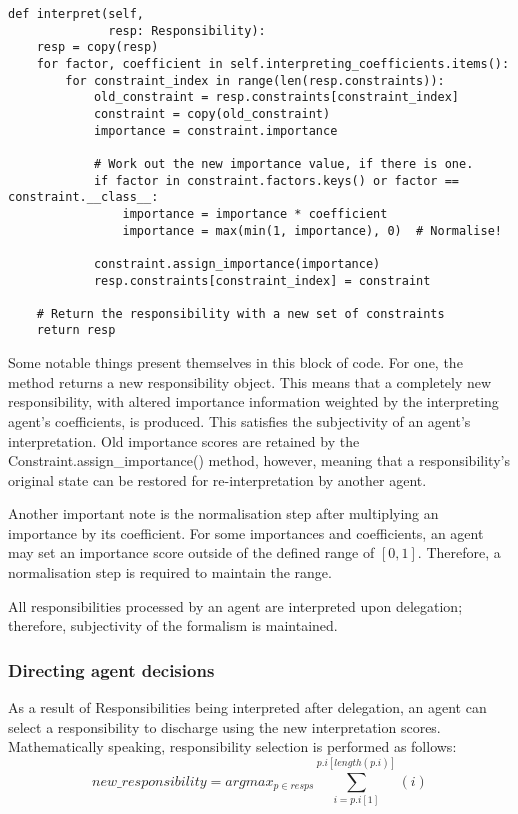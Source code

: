 \begin{lstlisting}
def interpret(self,
              resp: Responsibility):
    resp = copy(resp)
    for factor, coefficient in self.interpreting_coefficients.items():
        for constraint_index in range(len(resp.constraints)):
            old_constraint = resp.constraints[constraint_index]
            constraint = copy(old_constraint)
            importance = constraint.importance

            # Work out the new importance value, if there is one.
            if factor in constraint.factors.keys() or factor == constraint.__class__:
                importance = importance * coefficient
                importance = max(min(1, importance), 0)  # Normalise!

            constraint.assign_importance(importance)
            resp.constraints[constraint_index] = constraint

    # Return the responsibility with a new set of constraints
    return resp
\end{lstlisting}

Some notable things present themselves in this block of code. For one, the method returns a new responsibility object. This means that a completely new responsibility, with altered importance information weighted by the interpreting agent's coefficients, is produced. This satisfies the subjectivity of an agent's interpretation. Old importance scores are retained by the Constraint.assign\_importance() method, however, meaning that a responsibility's original state can be restored for re-interpretation by another agent.\par

Another important note is the normalisation step after multiplying an importance by its coefficient. For some importances and coefficients, an agent may set an importance score outside of the defined range of \([0,1]\). Therefore, a normalisation step is required to maintain the range.\par

All responsibilities processed by an agent are interpreted upon delegation; therefore, subjectivity of the formalism is maintained.\par

\subsubsection{Directing agent decisions}  %
As a result of Responsibilities being interpreted after delegation, an agent can select a responsibility to discharge using the new interpretation scores. Mathematically speaking, responsibility selection is performed as follows: \[new\_responsibility = argmax_{p \in resps} {\sum_{i=p.i[1]}^{p.i[length(p.i)]}(i)}\]

